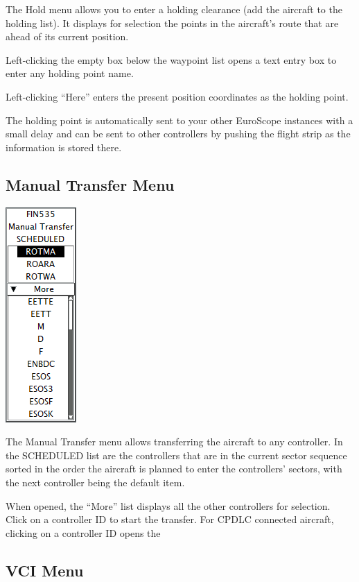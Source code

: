\documentclass[11pt,a4paper]{memoir}
\begin{document}
The Hold menu allows you to enter a holding clearance (add the aircraft to the holding list). It displays for selection the points in the aircraft’s route that are ahead of its current position.

Left-clicking the empty box below the waypoint list opens a text entry box to enter any holding point name.

Left-clicking “Here” enters the present position coordinates as the holding point.

The holding point is automatically sent to your other EuroScope instances with a small delay and can be sent to other controllers by pushing the flight strip as the information is stored there.

\subsection{Manual Transfer Menu}
\label{menu:mxfr}

\includegraphics{img/mxfr.png}

The Manual Transfer menu allows transferring the aircraft to any controller. In the SCHEDULED list are the controllers that are in the current sector sequence sorted in the order the aircraft is planned to enter the controllers’ sectors, with the next controller being the default item.

When opened, the “More” list displays all the other controllers for selection. Click on a controller ID to start the transfer. For CPDLC connected aircraft, clicking on a controller ID opens the \textit{}

\subsection{VCI Menu}
\label{menu:vci}
\end{document}
